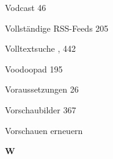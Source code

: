 \documentclass{book}
\renewcommand\indexspace{\vspace{11pt}}
\begin{document}
\begin{multicols}{2}
\begin{osp-index}
  \item Vodcast\hspace{1mm} 46
  \item Vollst\"andige RSS-Feeds\hspace{1mm} 205
  \item Volltextsuche\hspace{1mm} , 442
  \item Voodoopad\hspace{1mm} 195
  \item Voraussetzungen\hspace{1mm} 26
  \item Vorschaubilder\hspace{1mm} 367
  \item Vorschauen erneuern\hspace{1mm} 

  \indexspace
{\sffamily\bfseries W}\nopagebreak


\end{osp-index}
\end{multicols}
\end{document}
